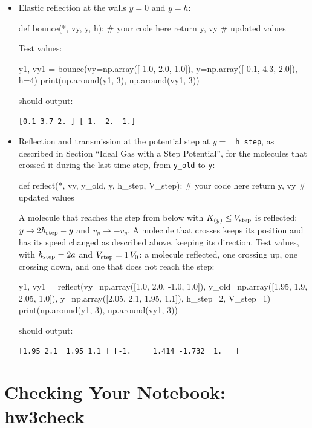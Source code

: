 \documentclass[12pt]{article}
\begin{document}
\begin{itemize}
\item Elastic reflection at the walls $y = 0$ and $y = h$:
\begin{python}
def bounce(*, vy, y, h):
    # your code here
    return y, vy # updated values
\end{python}
  Test values:
\begin{python}
y1, vy1 = bounce(vy=np.array([-1.0, 2.0, 1.0]), y=np.array([-0.1, 4.3, 2.0]), h=4)
print(np.around(y1, 3), np.around(vy1, 3))
\end{python}
  should output:
\begin{verbatim}
[0.1 3.7 2. ] [ 1. -2.  1.]
\end{verbatim}
\item Reflection and transmission at the potential step at $y = $ {\tt
  h\_step}, as described in Section ``Ideal Gas with a Step
  Potential'', for the molecules that crossed it during the last time
  step, from {\tt y\_old} to {\tt y}:
\begin{python}
def reflect(*, vy, y_old, y, h_step, V_step):
    # your code here
    return y, vy # updated values
\end{python}
  A molecule that reaches the step from below with $K_{(y)} \le V_{\rm
  step}$ is reflected: $y \to 2 h_{\rm step} - y$ and $v_y \to -v_y$.
  A molecule that crosses keeps its position and has its speed changed
  as described above, keeping its direction.  Test values, with
  $h_{\rm step} = 2a$ and $V_{\rm step} = 1\,V_0$: a molecule reflected,
  one crossing up, one crossing down, and one that does not reach the
  step:
\begin{python}
y1, vy1 = reflect(vy=np.array([1.0, 2.0, -1.0, 1.0]),
                  y_old=np.array([1.95, 1.9, 2.05, 1.0]),
                  y=np.array([2.05, 2.1, 1.95, 1.1]), h_step=2, V_step=1)
print(np.around(y1, 3), np.around(vy1, 3))
\end{python}
  should output:
\begin{verbatim}
[1.95 2.1  1.95 1.1 ] [-1.     1.414 -1.732  1.   ]
\end{verbatim}
\end{itemize}

\section{Checking Your Notebook: hw3check}
\end{document}
